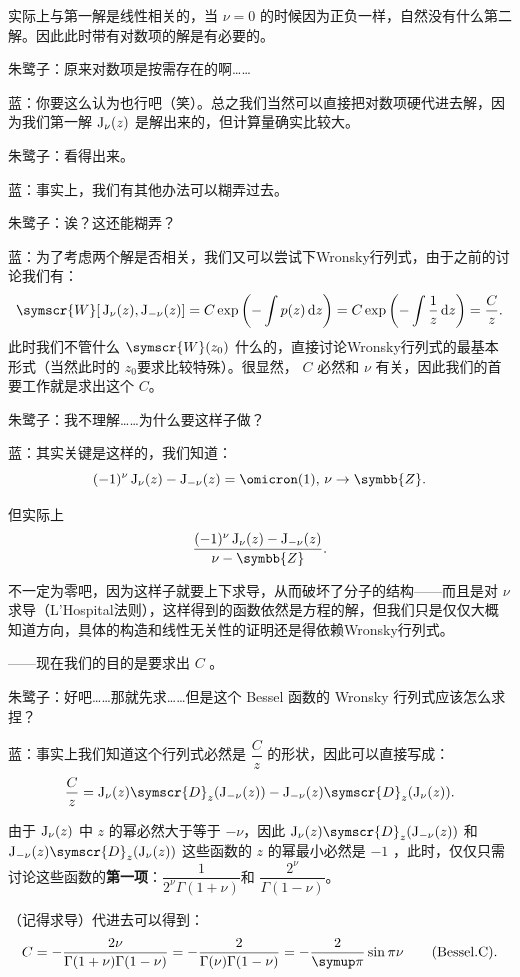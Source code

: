实际上与第一解是线性相关的，当 \(\nu =0\) 的时候因为正负一样，自然没有什么第二解。因此此时带有对数项的解是有必要的。

朱鹭子：原来对数项是按需存在的啊……

蓝：你要这么认为也行吧（笑）。总之我们当然可以直接把对数项硬代进去解，因为我们第一解 \(\operatorname{J} _{\nu }(z)\) 是解出来的，但计算量确实比较大。

朱鹭子：看得出来。

蓝：事实上，我们有其他办法可以糊弄过去。

朱鹭子：诶？这还能糊弄？

蓝：为了考虑两个解是否相关，我们又可以尝试下Wronsky行列式，由于之前的讨论我们有：
\[
	\symscr{W}[\,\besselj_{\nu}(z),\besselj_{- \nu} (z)] = C\exp \left( -\int p(z) \,\mathrm{d}z  \right) =C\exp \left( -\int \frac{1}{z} \,\mathrm{d}z  \right) =\frac{C}{z}
	.\]
此时我们不管什么 \(\symscr{W} (z_0)\) 什么的，直接讨论Wronsky行列式的最基本形式（当然此时的 \(z_0\)要求比较特殊）。很显然， \(C\) 必然和 \(\nu \) 有关，因此我们的首要工作就是求出这个 \(C\)。

朱鹭子：我不理解……为什么要这样子做？

蓝：其实关键是这样的，我们知道：
\[
	(-1)^{\nu }\besselj _ \nu (z)-\besselj _ {-\nu }(z)= \omicron (1),\,\nu  \to\symbb{Z}
	.\]

但实际上
\[
	\frac{(-1)^{\nu }\besselj_ \nu (z)-\besselj _ {-\nu }(z)}{\nu -\symbb{Z} }
	.\]

不一定为零吧，因为这样子就要上下求导，从而破坏了分子的结构——而且是对 \(\nu \) 求导（L'Hospital法则），这样得到的函数依然是方程的解，但我们只是仅仅大概知道方向，具体的构造和线性无关性的证明还是得依赖Wronsky行列式。

——现在我们的目的是要求出 \(C\) 。

朱鹭子：好吧……那就先求……但是这个 Bessel 函数的 Wronsky 行列式应该怎么求捏？

蓝：事实上我们知道这个行列式必然是 \( \dfrac Cz\) 的形状，因此可以直接写成：
\[
	\dfrac Cz= \besselj_ \nu (z)\symscr{D} _ z(\besselj_{-\nu }(z))-\besselj_{- \nu} (z)\symscr{D} _ z(\besselj_{\nu }(z))
	.\]

由于 \( \operatorname{J}_ \nu (z)\) 中 \(z\) 的幂必然大于等于 \(-\nu \)，因此 \( \besselj_ \nu (z)\symscr{D} _ z(\besselj_{-\nu }(z))\) 和 \(\besselj_{- \nu} (z)\symscr{D} _ z(\besselj_{\nu }(z))\) 这些函数的 \(z\) 的幂最小必然是 \(-1\) ，此时，仅仅只需讨论这些函数的\textbf{第一项}：\( \dfrac{1}{2^\nu \Gamma (1+\nu )}\)和 \(\dfrac{2^\nu}{ \Gamma (1-\nu )}\)。

（记得求导）代进去可以得到：
\[
	C= -\frac{2\nu }{\Gamma (1+\nu )\Gamma (1-\nu )} = -\frac{2}{\Gamma (\nu )\Gamma (1-\nu )}= -\frac{2}{\symup \pi }\sin \pi \nu \tag{Bessel.C}
	.\]

